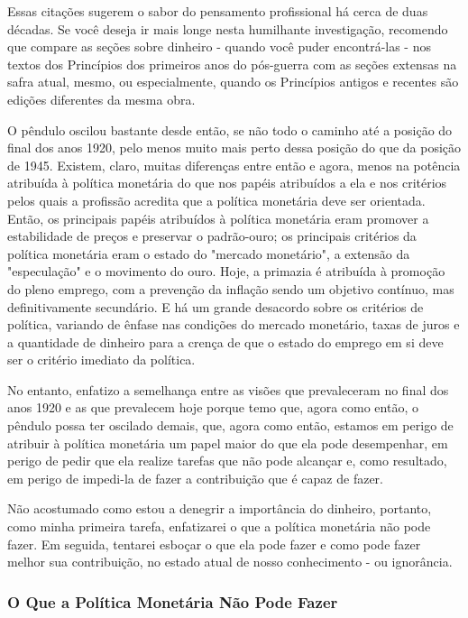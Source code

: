 \documentclass[12pt]{article}
\begin{document}
Essas citações sugerem o sabor do pensamento profissional há cerca de duas décadas. Se você deseja ir mais longe nesta humilhante investigação, recomendo que compare as seções sobre dinheiro - quando você puder encontrá-las - nos textos dos Princípios dos primeiros anos do pós-guerra com as seções extensas na safra atual, mesmo, ou especialmente, quando os Princípios antigos e recentes são edições diferentes da mesma obra.

O pêndulo oscilou bastante desde então, se não todo o caminho até a posição do final dos anos 1920, pelo menos muito mais perto dessa posição do que da posição de 1945. Existem, claro, muitas diferenças entre então e agora, menos na potência atribuída à política monetária do que nos papéis atribuídos a ela e nos critérios pelos quais a profissão acredita que a política monetária deve ser orientada. Então, os principais papéis atribuídos à política monetária eram promover a estabilidade de preços e preservar o padrão-ouro; os principais critérios da política monetária eram o estado do "mercado monetário", a extensão da "especulação" e o movimento do ouro. Hoje, a primazia é atribuída à promoção do pleno emprego, com a prevenção da inflação sendo um objetivo contínuo, mas definitivamente secundário. E há um grande desacordo sobre os critérios de política, variando de ênfase nas condições do mercado monetário, taxas de juros e a quantidade de dinheiro para a crença de que o estado do emprego em si deve ser o critério imediato da política.

No entanto, enfatizo a semelhança entre as visões que prevaleceram no final dos anos 1920 e as que prevalecem hoje porque temo que, agora como então, o pêndulo possa ter oscilado demais, que, agora como então, estamos em perigo de atribuir à política monetária um papel maior do que ela pode desempenhar, em perigo de pedir que ela realize tarefas que não pode alcançar e, como resultado, em perigo de impedi-la de fazer a contribuição que é capaz de fazer.

Não acostumado como estou a denegrir a importância do dinheiro, portanto, como minha primeira tarefa, enfatizarei o que a política monetária não pode fazer. Em seguida, tentarei esboçar o que ela pode fazer e como pode fazer melhor sua contribuição, no estado atual de nosso conhecimento - ou ignorância.

\subsubsection{\textbf{O Que a Política Monetária Não Pode Fazer}}
\end{document}
